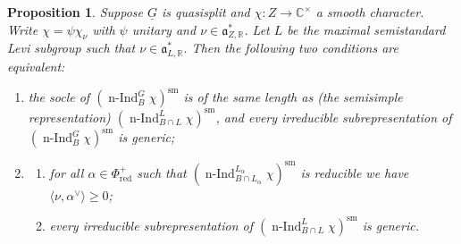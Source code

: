 \documentclass[a4paper]{amsart}
\numberwithin{equation}{section}
\newtheorem{prop}[thm]{Proposition}
\theoremstyle{remark}
\theoremstyle{definition}
\DeclareMathOperator{\nInd}{n-Ind}
\newcommand{\C}{\mathbb{C}}
\newcommand{\R}{\mathbb{R}}
\newcommand{\sm}{\mathrm{sm}}
\newcommand{\alggrp}[1]{\underline{#1}}
\newcommand{\red}{\mathrm{red}}
\newcommand{\ang}[1]{\langle #1\rangle}
\begin{document}
\begin{prop}\label{prop:qsplit-irred-gen-socle}
  Suppose $\alggrp G$ is quasisplit and $\chi \colon Z \to \C^{\times}$ a smooth character.
  Write $\chi = \psi \chi_\nu$ with $\psi$ unitary and $\nu \in \mathfrak{a}^{*}_{Z,\R}$.
  Let $L$ be the maximal semistandard Levi subgroup such that $\nu \in \mathfrak{a}^{*}_{L,\R}$.
  Then the following two conditions are equivalent:
  \begin{enumerate}
  \item
    the socle of $(\nInd_{B}^{G} \chi)^{\sm}$ is of the same length as (the semisimple representation) $(\nInd_{B \cap L}^{L} \chi)^{\sm}$,
    and every irreducible subrepresentation of $(\nInd_{B}^{G} \chi)^{\sm}$ is generic;
  \item 
    \begin{enumerate}
    \item for all $\alpha \in \Phi^+_{\red}$ such that $(\nInd_{B \cap L_\alpha}^{L_\alpha} \chi)^{\sm}$ is reducible we have
      $\ang{\nu,\alpha^\vee} \ge 0$;
    \item every irreducible subrepresentation of $(\nInd_{B \cap L}^{L} \chi)^{\sm}$ is generic.
    \end{enumerate}
  \end{enumerate}
\end{prop}
\end{document}
